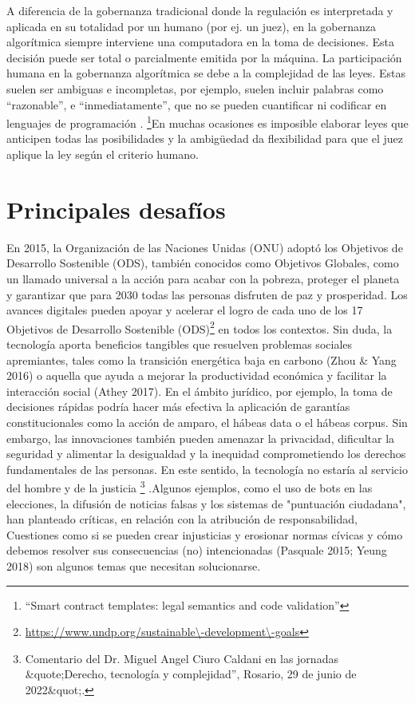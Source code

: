 \documentclass[12pt]{report} %
\begin{document}
A diferencia de la gobernanza tradicional donde la regulación es interpretada y aplicada en su totalidad por un humano (por ej. un juez), en la gobernanza algorítmica siempre interviene una computadora en la toma de decisiones. Esta decisión puede ser total o parcialmente emitida por la máquina. La participación humana en la gobernanza algorítmica se debe a la complejidad de las leyes. Estas suelen ser ambiguas e incompletas, por ejemplo, suelen incluir palabras como “razonable”, e “inmediatamente”, que no se pueden cuantificar ni codificar en lenguajes de programación . \footnote{\cite{Christopher2019}“Smart contract templates: legal semantics and code validation”}En muchas ocasiones es imposible elaborar leyes que anticipen todas las posibilidades y la ambigüedad da flexibilidad para que el juez aplique la ley según el criterio humano.

\section{Principales desafíos  }

En 2015, la Organización de las Naciones Unidas (ONU) adoptó los Objetivos de Desarrollo Sostenible (ODS), también conocidos como Objetivos Globales, como un llamado universal a la acción para acabar con la pobreza, proteger el planeta y garantizar que para 2030 todas las personas disfruten de paz y prosperidad. Los avances digitales pueden apoyar y acelerar el logro de cada uno de los 17 Objetivos de Desarrollo Sostenible (ODS)\footnote{\url{https://www.undp.org/sustainable\-development\-goals}}  en todos los contextos. Sin duda, la tecnología aporta beneficios tangibles que resuelven problemas sociales apremiantes, tales como la transición energética baja en carbono (Zhou \& Yang 2016) o aquella que ayuda a mejorar la productividad económica y facilitar la interacción social (Athey 2017). En el ámbito jurídico, por ejemplo, la toma de decisiones rápidas podría hacer más efectiva la aplicación de garantías constitucionales como la acción de amparo, el hábeas data o el hábeas corpus. Sin embargo, las innovaciones también pueden amenazar la privacidad, dificultar la seguridad y alimentar la desigualdad y la inequidad comprometiendo los derechos fundamentales de las personas. En este sentido, la tecnología no estaría al servicio del hombre y de la justicia \footnote{Comentario del Dr. Miguel Angel Ciuro Caldani en las jornadas \&quote;Derecho, tecnología y complejidad”, Rosario, 29 de junio de 2022\&quot;.} .Algunos ejemplos, como el uso de bots en las elecciones, la difusión de noticias falsas y los sistemas de "puntuación ciudadana", han planteado críticas, en relación con la atribución de responsabilidad, Cuestiones como si se pueden crear injusticias y erosionar normas cívicas y cómo debemos resolver sus consecuencias (no) intencionadas (Pasquale 2015; Yeung 2018) son algunos temas que necesitan solucionarse. 
\end{document}
